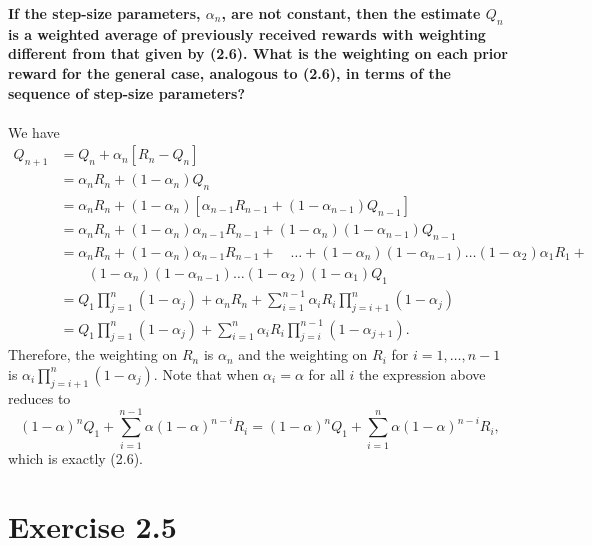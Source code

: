 \documentclass[a4paper,11pt]{article}
\numberwithin{equation}{section}
\theoremstyle{remark}
\begin{document}
\textbf{If the step-size parameters, $\alpha_n$, are not constant, then the estimate $Q_n$ is a weighted average of previously received rewards with weighting different from that given by (2.6). What is the weighting on each prior reward for the general case, analogous to (2.6), in terms of the sequence of step-size parameters?}
\\ \\ 
We have
\begin{align*}
	Q_{n+1} & = Q_n + \alpha_n[R_n - Q_n] \\
			& = \alpha_n R_n + (1-\alpha_n) Q_n \\
			& = \alpha_n R_n + (1-\alpha_n)[\alpha_{n-1} R_{n-1} + (1-\alpha_{n-1}) Q_{n-1}] \\
			& = \alpha_n R_n + (1-\alpha_n)\alpha_{n-1}R_{n-1} + (1-\alpha_n)(1-\alpha_{n-1})Q_{n-1} \\
			& = \alpha_n R_n + (1-\alpha_n)\alpha_{n-1}R_{n-1} + \quad \dots + (1-\alpha_n)(1-\alpha_{n-1})\dots (1-\alpha_2)\alpha_1 R_1 + \\
			& \quad \quad (1-\alpha_n)(1-\alpha_{n-1})\dots (1-\alpha_2)(1-\alpha_1) Q_1 \\
			& = Q_1\prod_{j=1}^{n}(1-\alpha_j) + \alpha_n R_n + \sum_{i=1}^{n-1}\alpha_i R_i \prod_{j=i+1}^{n}(1-\alpha_j)\\
			& = Q_1\prod_{j=1}^{n}(1-\alpha_j) + \sum_{i=1}^{n}\alpha_i R_i \prod_{j=i}^{n-1}(1-\alpha_{j+1}).
\end{align*}
Therefore, the weighting on $R_n$ is $\alpha_n$ and the weighting on $R_i$ for $i=1,\dots,n-1$ is $\alpha_i \prod_{j=i+1}^{n}(1-\alpha_j)$. Note that when $\alpha_i = \alpha$ for all $i$ the expression above reduces to
\[
	(1-\alpha)^n Q_1 +  \sum_{i=1}^{n-1}\alpha(1-\alpha)^{n-i}R_i = (1-\alpha)^n Q_1 + \sum_{i=1}^{n}\alpha(1-\alpha)^{n-i}R_i,
\]
which is exactly (2.6).


\section{Exercise 2.5}
\end{document}
